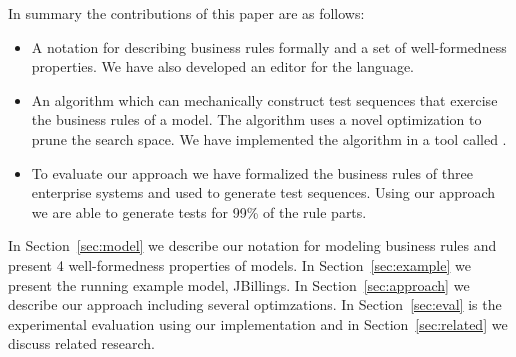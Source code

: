 In summary the contributions of this paper are as follows:
\begin{itemize}[noitemsep]
\item A notation for describing business rules formally and a set of
  well-formedness properties. We have also developed an editor for the
  language.
\item An algorithm which can mechanically construct test sequences
  that exercise the business rules of a model. The algorithm uses a
  novel optimization to prune the search space. We have implemented
  the algorithm in a tool called \tool{}.
\item To evaluate our approach we have formalized the business rules
  of three enterprise systems and used \tool{} to generate test
  sequences. Using our approach we are able to generate tests for 99\%
  of the rule parts.
\end{itemize}

In Section~\ref{sec:model} we describe our notation for modeling business
rules and present 4 well-formedness properties of
models. In Section~\ref{sec:example} we present the running example
model, JBillings. In Section~\ref{sec:approach} we describe our approach including several
optimzations. In Section~\ref{sec:eval} is the experimental evaluation using
our implementation \tool{} and in Section~\ref{sec:related} we discuss related
research.   
